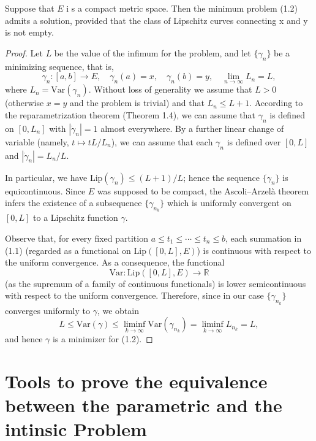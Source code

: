 \documentclass[12pt]{article}
\begin{document}
{\begin{theorem}
    Suppose that $E$ i s a compact metric space. Then the minimum problem (1.2) admits a solution, provided that the class of Lipschitz curves connecting x and y is not empty.
\end{theorem}

\begin{proof}
    Let $L$ be the value of the infimum for the problem, and let $\{\gamma_n\}$ 
    be a minimizing sequence, that is,
    \[
        \gamma_n : [a,b] \to E, \quad \gamma_n(a) = x, \quad \gamma_n(b) = y, 
        \quad \lim_{n \to \infty} L_n = L,
    \]
    where $L_n = \mathrm{Var}(\gamma_n)$. Without loss of generality we assume 
    that $L > 0$ (otherwise $x = y$ and the problem is trivial) and that 
    $L_n \leqslant L + 1$. According to the reparametrization theorem 
    (Theorem 1.4), we can assume that $\gamma_n$ is defined on $[0, L_n]$ 
    with $|\dot{\gamma}_n| = 1$ almost everywhere. By a further linear change 
    of variable (namely, $t \mapsto tL/L_n$), we can assume that each 
    $\gamma_n$ is defined over $[0, L]$ and $|\dot{\gamma}_n| = L_n/L$.

    In particular, we have $\mathrm{Lip}(\gamma_n) \leqslant (L+1)/L$; hence 
    the sequence $\{\gamma_n\}$ is equicontinuous. Since $E$ was supposed to 
    be compact, the Ascoli–Arzelà theorem infers the existence of a 
    subsequence $\{\gamma_{n_k}\}$ which is uniformly convergent on $[0, L]$ 
    to a Lipschitz function $\gamma$.

    Observe that, for every fixed partition $a \leqslant t_1 \leqslant \cdots 
    \leqslant t_n \leqslant b$, each summation in (1.1) (regarded as a 
    functional on $\mathrm{Lip}([0,L], E)$) is continuous with respect to the 
    uniform convergence. As a consequence, the functional
    \[
        \mathrm{Var} : \mathrm{Lip}([0, L], E) \to \mathbb{R}
    \]
    (as the supremum of a family of continuous functionals) is lower 
    semicontinuous with respect to the uniform convergence. Therefore, since 
    in our case $\{\gamma_{n_k}\}$ converges uniformly to $\gamma$, we obtain
    \[
        L \leqslant \mathrm{Var}(\gamma) \leqslant \liminf_{k \to \infty} 
        \mathrm{Var}(\gamma_{n_k}) = \liminf_{k \to \infty} L_{n_k} = L,
    \]
    and hence $\gamma$ is a minimizer for (1.2).
\end{proof}


\section{Tools to prove the equivalence between the parametric and the intinsic Problem} \label{sec:nonparam}

}
\end{document}
